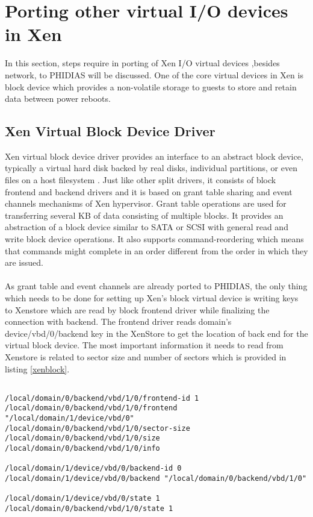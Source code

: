\section{Porting other virtual I/O devices in Xen \label{sec:otherio}}
In this section, steps require in porting of Xen I/O virtual devices ,besides network, to PHIDIAS will be discussed.  One of the core virtual devices in Xen is block device which provides a non-volatile storage to guests to store and retain data between power reboots.

\subsection{Xen Virtual Block Device Driver \label{sec:block}}
Xen virtual block device driver provides an interface to an abstract block device, typically a virtual hard disk backed by real disks, individual partitions, or even files on a host filesystem \cite{xen_book}. Just like other split drivers, it consists of block frontend and backend drivers and it is based on grant table sharing and event channels mechanisms of Xen hypervisor. Grant table operations are used for transferring several KB of data consisting of multiple blocks. It provides an abstraction of a block device similar to SATA or SCSI with general read and write block device operations. It also supports command-reordering which means that commands might complete in an order different from the order in which they are issued.
\\
\\
As grant table and event channels are already ported to PHIDIAS, the only thing which needs to be done for setting up Xen's block virtual device is writing keys to Xenstore which are read by block frontend driver while finalizing the connection with backend. The frontend driver reads domain's device/vbd/0/backend key in the XenStore to get the location of back end for the virtual block device. The most important information it needs to read from Xenstore is related to sector size and  number of sectors which is provided in listing \ref{xenblock}.

\begin{lstlisting}[caption= Keys in Xenstore for connecting virtual block device frontend driver with backend in Xen ,label={xenblock}]

/local/domain/0/backend/vbd/1/0/frontend-id 1
/local/domain/0/backend/vbd/1/0/frontend "/local/domain/1/device/vbd/0"
/local/domain/0/backend/vbd/1/0/sector-size
/local/domain/0/backend/vbd/1/0/size
/local/domain/0/backend/vbd/1/0/info

/local/domain/1/device/vbd/0/backend-id 0
/local/domain/1/device/vbd/0/backend "/local/domain/0/backend/vbd/1/0"

/local/domain/1/device/vbd/0/state 1
/local/domain/0/backend/vbd/1/0/state 1

\end{lstlisting}

